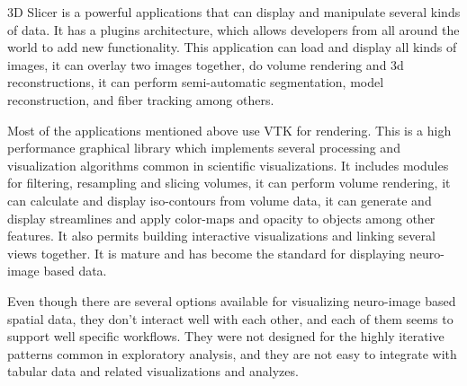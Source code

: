 
3D Slicer \autocite{fedorov_3d_2012} is a powerful applications that can display and manipulate several kinds of data. It has a plugins architecture, which allows developers from all around the world to add new functionality. This application can load and display all kinds of images, it can overlay two images together, do volume rendering and 3d reconstructions, it can perform semi-automatic segmentation, model reconstruction, and fiber tracking among others. 


Most of the applications mentioned above use VTK \autocite{schroeder_design_1996} for rendering. This is a high performance graphical library which implements several processing and visualization algorithms common in scientific visualizations. It includes modules for filtering, resampling and slicing volumes, it can perform volume rendering, it can calculate and display iso-contours from volume data, it can generate and display streamlines and apply color-maps and opacity to objects among other features. It also permits building interactive visualizations and linking several views together.
It is mature and has become the standard for displaying neuro-image based data. 

Even though there are several options available for visualizing neuro-image based spatial data, they don't interact well with each other, and each of them seems to support well specific workflows. They were not designed for the highly iterative patterns common in exploratory analysis, and they are not easy to integrate with tabular data and related visualizations and analyzes. 





